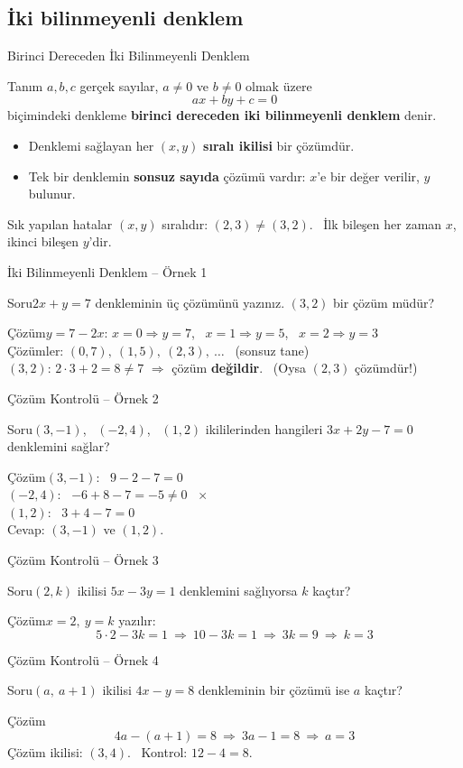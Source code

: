\documentclass[aspectratio=169,11pt,handout]{beamer}
\newcommand{\soru}[3]{%
\begin{frame}{#1}
  \begin{block}{Soru}\large #2\end{block}
  \pause
  \begin{exampleblock}{Çözüm}\large #3\end{exampleblock}
\end{frame}}
\begin{document}
\subsection{İki bilinmeyenli denklem}
\begin{frame}{Birinci Dereceden İki Bilinmeyenli Denklem}
\begin{block}{Tanım}
\(a,b,c\) gerçek sayılar, \(a\neq 0\) ve \(b\neq 0\) olmak üzere
\[ax+by+c=0\]
biçimindeki denkleme \textbf{birinci dereceden iki bilinmeyenli denklem} denir.
\begin{itemize}
\item Denklemi sağlayan her \((x,y)\) \textbf{sıralı ikilisi} bir çözümdür.
\item Tek bir denklemin \textbf{sonsuz sayıda} çözümü vardır: \(x\)'e bir değer verilir, \(y\) bulunur.
\end{itemize}
\end{block}
\begin{alertblock}{Sık yapılan hatalar}
\((x,y)\) sıralıdır: \((2,3)\neq(3,2)\). \ İlk bileşen her zaman \(x\), ikinci bileşen \(y\)'dir.
\end{alertblock}
\end{frame}

\soru{İki Bilinmeyenli Denklem -- Örnek 1}
{\(2x+y=7\) denkleminin üç çözümünü yazınız. \((3,2)\) bir çözüm müdür?}
{\(y=7-2x\): \quad \(x=0\Rightarrow y=7\), \ \(x=1\Rightarrow y=5\), \ \(x=2\Rightarrow y=3\)\\[3pt]
Çözümler: \((0,7),\ (1,5),\ (2,3),\ \dots\) \ (sonsuz tane)\\[3pt]
\((3,2)\): \(2\cdot 3+2=8\neq 7\) \(\Rightarrow\) çözüm \textbf{değildir}. \ (Oysa \((2,3)\) çözümdür!)}

\soru{Çözüm Kontrolü -- Örnek 2}
{\((3,-1)\), \ \((-2,4)\), \ \((1,2)\) ikililerinden hangileri \(3x+2y-7=0\) denklemini sağlar?}
{\((3,-1)\): \ \(9-2-7=0\) \ \checkmark\\[2pt]
\((-2,4)\): \ \(-6+8-7=-5\neq 0\) \ \(\times\)\\[2pt]
\((1,2)\): \ \(3+4-7=0\) \ \checkmark\\[4pt]
Cevap: \((3,-1)\) ve \((1,2)\).}

\soru{Çözüm Kontrolü -- Örnek 3}
{\((2,k)\) ikilisi \(5x-3y=1\) denklemini sağlıyorsa \(k\) kaçtır?}
{\(x=2,\ y=k\) yazılır:
\[5\cdot 2-3k=1\ \Rightarrow\ 10-3k=1\ \Rightarrow\ 3k=9\ \Rightarrow\ k=3\]}

\soru{Çözüm Kontrolü -- Örnek 4}
{\((a,\ a+1)\) ikilisi \(4x-y=8\) denkleminin bir çözümü ise \(a\) kaçtır?}
{\[4a-(a+1)=8\ \Rightarrow\ 3a-1=8\ \Rightarrow\ a=3\]
Çözüm ikilisi: \((3,4)\). \ Kontrol: \(12-4=8\).}
\end{document}
